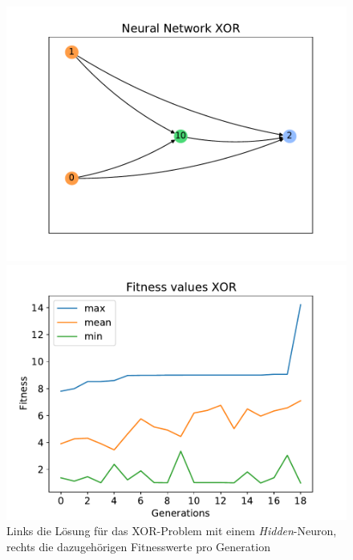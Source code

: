 \begin{figure}[!h]
	\centering
	\begin{minipage}[]{0.49\textwidth}
		\includegraphics[width=1.0\textwidth]{./img/xor_single_core/xor_neural_network.pdf} 
	\end{minipage}
	\hfill
	\begin{minipage}[]{0.49\textwidth}
		\includegraphics[width=1.0\textwidth]{./img/xor_single_core/xor_fitness.pdf} 
	\end{minipage}
	\caption{Links die Lösung für das XOR-Problem mit einem \emph{Hidden}-Neuron, rechts die dazugehörigen Fitnesswerte pro Generation}
	\label{fig:xor_solution_minimal}
\end{figure}
